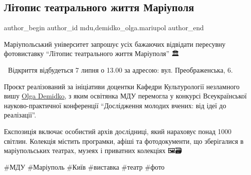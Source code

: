  
 
 
 
 

\subsection{Літопис театрального життя Маріуполя}
\label{sec:29_06_2023.fb.mdu.1.litopys_teatralnogo_zhyttja_mariupolja}
 
\ifcmt
 author_begin
   author_id mdu,demidko_olga.mariupol
 author_end
\fi

Маріупольський університет запрошує усіх бажаючих відвідати пересувну
фотовиставку \enquote{Літопис театрального життя Маріуполя} 🏛💃

📆 Відкриття відбудеться 7 липня о 13.00 за адресою: вул. Преображенська, 6.

Проєкт реалізований за ініціативи доцентки Кафедри Культурології незламного
вишу \href{\urlDemidkoIA}{Olga Demidko}, з яким освітянка МДУ перемогла у конкурсі Всеукраїнської
науково-практичної конференції \enquote{Дослідження молодих вчених: від ідеї до
реалізації}.

Експозиція включає особистий архів дослідниці, який нараховує понад 1000
світлин. Колекція містить програмки, афіші та фотодокументи, що зберігалися в
маріупольських театрах, музеях і приватних колекціях 🖼🗃

\#МДУ \#Маріуполь \#Київ \#виставка \#театр \#фото

